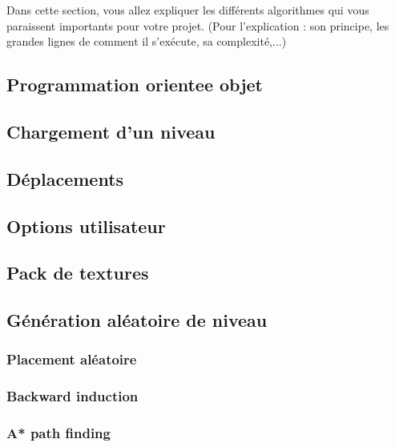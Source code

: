 \documentclass[../main.tex]{subfiles}
\begin{document}
Dans cette section, vous allez expliquer les différents algorithmes qui vous paraissent importants pour votre projet. (Pour l'explication : son principe, les grandes lignes de comment il s'exécute, sa complexité,...)

\subsection{Programmation orientee objet}

\subsection{Chargement d'un niveau}

\subsection{Déplacements}

\subsection{Options utilisateur}

\subsection{Pack de textures}

\subsection{Génération aléatoire de niveau}
\subsubsection{Placement aléatoire}
\subsubsection{Backward induction}
\subsubsection{A* path finding}
\end{document}
